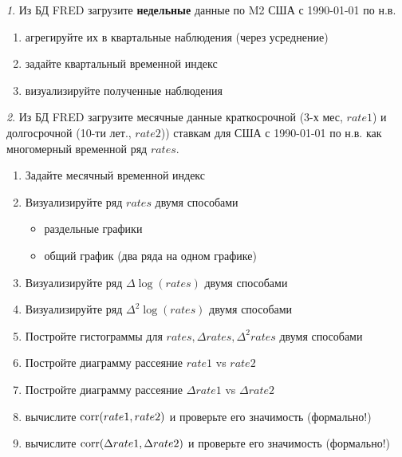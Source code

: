 \documentclass[12pt]{article}
\theoremstyle{remark}
\newtheorem{exercise}{}[subsection]
\begin{document}
\begin{exercise}
Из БД FRED загрузите \textbf{недельные} данные по M2 США с 1990-01-01 по н.в.
\begin{enumerate}
	\item агрегируйте их в квартальные наблюдения (через усреднение)
	\item задайте квартальный временной индекс
	\item визуализируйте полученные наблюдения 
\end{enumerate}
\end{exercise}

\begin{exercise}
Из БД FRED загрузите месячные данные краткосрочной (3-х мес, \(rate1\)) и долгосрочной (10-ти лет., \(rate2\)))
ставкам для США с 1990-01-01 по н.в. как многомерный временной ряд \(rates\).
\begin{enumerate}
	\item Задайте месячный временной индекс
	\item Визуализируйте ряд \(rates\) двумя способами
	\begin{itemize}
		\item раздельные графики
		\item общий график (два ряда на одном графике)
	\end{itemize}
	\item Визуализируйте ряд \(\Delta\log(rates)\) двумя способами
	\item Визуализируйте ряд \(\Delta^2\log(rates)\) двумя способами
	\item Постройте гистограммы для \(rates,\Delta rates,\Delta^2 rates\) двумя способами
	\item Постройте диаграмму рассеяние \(rate1\) vs \(rate2\)
	\item Постройте диаграмму рассеяние \(\Delta rate1 \) vs \(\Delta rate2\)
	\item вычислите \(\operatorname{corr}(rate1, rate2)\) и 
	проверьте его значимость (формально!)
	\item вычислите \(\operatorname{corr}(\Delta rate1, \Delta rate2)\) и 
	проверьте его значимость (формально!)
\end{enumerate}
\end{exercise}
\end{document}
